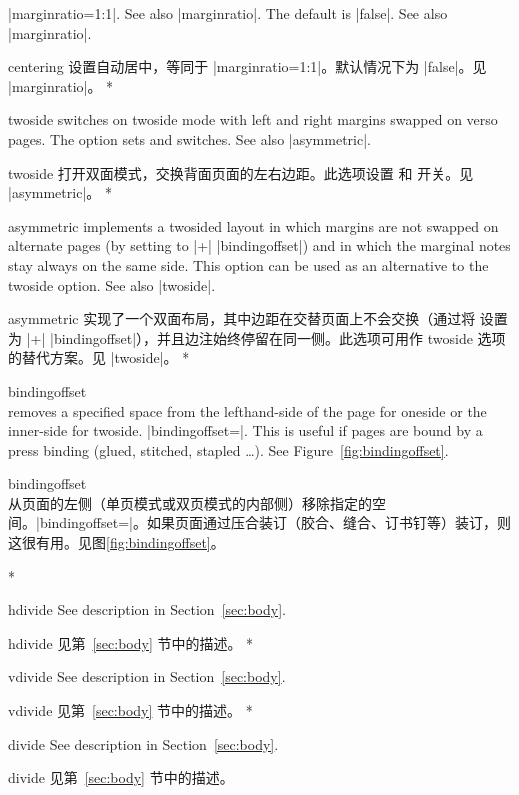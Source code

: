 \begin{Options}
\begin{paracol}{2}
  |marginratio=1:1|. See also |marginratio|. The default is |false|.
  See also |marginratio|.
\switchcolumn\item[centering] 设置自动居中，等同于 |marginratio=1:1|。默认情况下为 |false|。见 |marginratio|。
\switchcolumn[0]*\item[twoside] switches on twoside mode with left and right margins swapped
  on verso pages. The option sets  and  
  switches. See also |asymmetric|.
\switchcolumn\item[twoside] 打开双面模式，交换背面页面的左右边距。此选项设置  和  开关。见 |asymmetric|。
\switchcolumn[0]*\item[asymmetric] implements a twosided layout in which margins are
  not swapped on alternate pages (by setting  to 
   |+| |bindingoffset|) and in which the marginal notes
  stay always on the same side. This option can be used as an alternative
  to the twoside option. See also |twoside|.
\switchcolumn\item[asymmetric] 实现了一个双面布局，其中边距在交替页面上不会交换（通过将  设置为  |+| |bindingoffset|），并且边注始终停留在同一侧。此选项可用作 twoside 选项的替代方案。见 |twoside|。
\switchcolumn[0]*\item[bindingoffset]~\\ removes a specified space 
  from the lefthand-side of the page for oneside or the inner-side for
  twoside. |bindingoffset=|. This is useful if pages 
  are bound by a press binding (glued, stitched, stapled \ldots).
  See Figure~\ref{fig:bindingoffset}.
\switchcolumn\item[bindingoffset]~\\ 从页面的左侧（单页模式或双页模式的内部侧）移除指定的空间。|bindingoffset=|。如果页面通过压合装订（胶合、缝合、订书钉等）装订，则这很有用。见图\ref{fig:bindingoffset}。

\switchcolumn[0]*\item[hdivide] See description in Section~\ref{sec:body}.
\switchcolumn\item[hdivide] 见第~\ref{sec:body} 节中的描述。
\switchcolumn[0]*\item[vdivide] See description in Section~\ref{sec:body}.
\switchcolumn\item[vdivide] 见第~\ref{sec:body} 节中的描述。
\switchcolumn[0]*\item[divide] See description in Section~\ref{sec:body}.
\switchcolumn\item[divide] 见第~\ref{sec:body} 节中的描述。
\end{paracol}
\end{Options}





